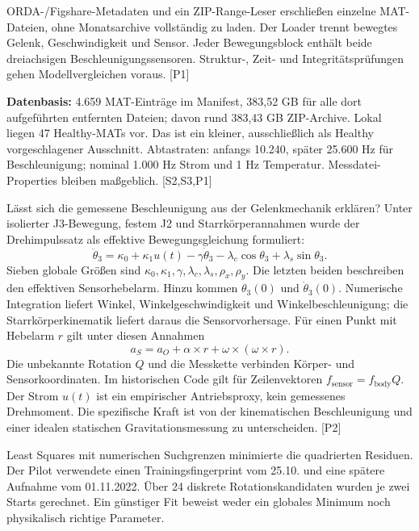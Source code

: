 \documentclass[11pt,a4paper]{article}
\newcommand{\src}[1]{{\footnotesize\color{muted}[#1]}}
\begin{document}
ORDA-/Figshare-Metadaten und ein ZIP-Range-Leser erschließen einzelne MAT-Dateien, ohne Monatsarchive vollständig zu laden. Der Loader trennt bewegtes Gelenk, Geschwindigkeit und Sensor. Jeder Bewegungsblock enthält beide dreiachsigen Beschleunigungssensoren. Struktur-, Zeit- und Integritätsprüfungen gehen Modellvergleichen voraus. \src{P1}

\textbf{Datenbasis:} 4.659 MAT-Einträge im Manifest, 383,52 GB für alle dort aufgeführten entfernten Dateien; davon rund 383,43 GB ZIP-Archive. Lokal liegen 47 Healthy-MATs vor. Das ist ein kleiner, ausschließlich als Healthy vorgeschlagener Ausschnitt. Abtastraten: anfangs 10.240, später 25.600 Hz für Beschleunigung; nominal 1.000 Hz Strom und 1 Hz Temperatur. Messdatei-Properties bleiben maßgeblich. \src{S2,S3,P1}

Lässt sich die gemessene Beschleunigung aus der Gelenkmechanik erklären? Unter isolierter J3-Bewegung, festem J2 und Starrkörperannahmen wurde der Drehimpulssatz als effektive Bewegungsgleichung formuliert:
\[
\ddot\theta_3=\kappa_0+\kappa_1u(t)-\gamma\dot\theta_3
-\lambda_c\cos\theta_3+\lambda_s\sin\theta_3.
\]
Sieben globale Größen sind $\kappa_0,\kappa_1,\gamma,\lambda_c,\lambda_s,\rho_x,\rho_y$. Die letzten beiden beschreiben den effektiven Sensorhebelarm. Hinzu kommen $\theta_3(0)$ und $\dot\theta_3(0)$. Numerische Integration liefert Winkel, Winkelgeschwindigkeit und Winkelbeschleunigung; die Starrkörperkinematik liefert daraus die Sensorvorhersage. Für einen Punkt mit Hebelarm $r$ gilt unter diesen Annahmen
\[
a_S=a_O+\alpha\times r+\omega\times(\omega\times r).
\]
Die unbekannte Rotation $Q$ und die Messkette verbinden Körper- und Sensorkoordinaten. Im historischen Code gilt für Zeilenvektoren $f_{\mathrm{sensor}}=f_{\mathrm{body}}Q$. Der Strom $u(t)$ ist ein empirischer Antriebsproxy, kein gemessenes Drehmoment. Die spezifische Kraft ist von der kinematischen Beschleunigung und einer idealen statischen Gravitationsmessung zu unterscheiden. \src{P2}

Least Squares mit numerischen Suchgrenzen minimierte die quadrierten Residuen. Der Pilot verwendete einen Trainingsfingerprint vom 25.10. und eine spätere Aufnahme vom 01.11.2022. Über 24 diskrete Rotationskandidaten wurden je zwei Starts gerechnet. Ein günstiger Fit beweist weder ein globales Minimum noch physikalisch richtige Parameter.
\end{document}
